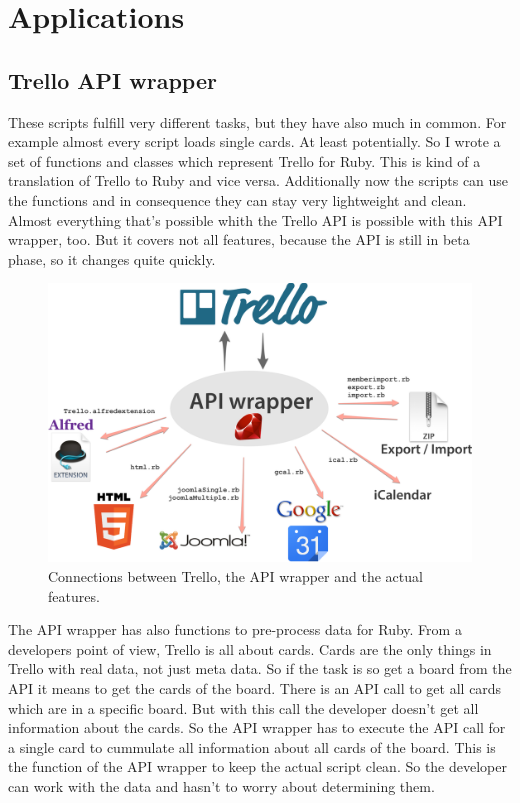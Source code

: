 
\chapter{Applications}

\section{Trello API wrapper}
These scripts fulfill very different tasks, but they have also much in common. For example almost every script loads single cards. At least potentially. So I wrote a set of functions and classes which represent Trello for Ruby. This is kind of a translation of Trello to Ruby and vice versa. Additionally now the scripts can use the functions and in consequence they can stay very lightweight and clean. Almost everything that's possible whith the Trello API is possible with this API wrapper, too. But it covers not all features, because the API is still in beta phase, so it changes quite quickly.

\begin{figure}[htb]
\centering
\includegraphics[width=\textwidth]{figures/api-wrapper}
\caption{Connections between Trello, the API wrapper and the actual features. \cite{ruby:icon}\cite{html:logo}\cite{joomla}\cite{google} }
\label{fig: api-wrapper}
\end{figure}

The API wrapper has also functions to pre-process data for Ruby. From a developers point of view, Trello is all about cards. Cards are the only things in Trello with real data, not just meta data. So if the task is so get a board from the API it means to get the cards of the board. There is an API call to get all cards which are in a specific board. But with this call the developer doesn't get all information about the cards. So the API wrapper has to execute the API call for a single card to cummulate all information about all cards of the board. This is the function of the API wrapper to keep the actual script clean. So the developer can work with the data and hasn't to worry about determining them.

